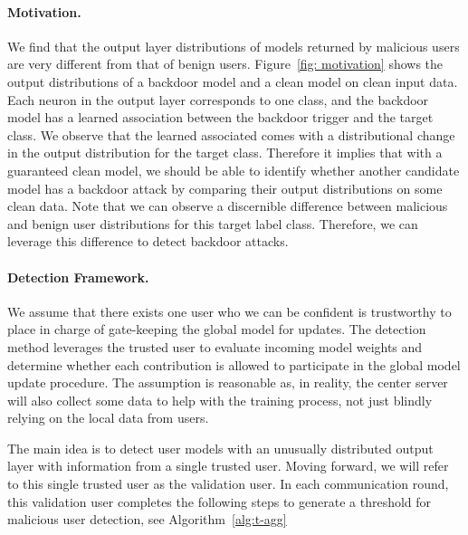 \documentclass{article} %
\newcommand{\yli}[1]{{\color{cyan}#1}}
\begin{document}
\vspace{-.25cm}
\paragraph{Motivation.} We find that the output layer distributions of models returned by malicious users are very different from that of benign users. Figure~\ref{fig: motivation} shows the output distributions of a backdoor model and a clean model on clean input data.  Each neuron in the output layer corresponds to one class, and the backdoor model has a learned association between the backdoor trigger and the target class. We observe that the learned associated comes with a distributional change in the output distribution for the target class. Therefore it implies that with a guaranteed clean model, we should be able to identify whether another candidate model has a backdoor attack by comparing their output distributions on some clean data.
Note that we can observe a discernible difference between malicious and benign user distributions for this target label class. Therefore, we can leverage this difference to detect backdoor attacks.

\vspace{-.25cm}
\paragraph{Detection Framework.}
We assume that there exists one user who we can be confident is trustworthy to place in charge of gate-keeping the global model for updates. The detection method leverages the trusted user to evaluate incoming model weights and determine whether each contribution is allowed to participate in the global model update procedure. \yli{The assumption is reasonable as, in reality, the center server will also collect some data to help with the training process, not just blindly relying on the local data from users.} 

The main idea is to detect user models with an unusually distributed output layer with information from a single trusted user. Moving forward, we will refer to this single trusted user as the validation user. In each communication round, this validation user completes the following steps to generate a threshold for malicious user detection, see Algorithm~\ref{alg:t-agg}
\end{document}
